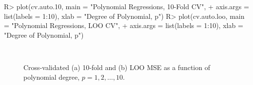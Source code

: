 \documentclass[
]{jss}
\begin{document}
\begin{CodeChunk}
\begin{CodeInput}
R> plot(cv.auto.10, main = "Polynomial Regressions, 10-Fold CV",
+      axis.args = list(labels = 1:10), xlab = "Degree of Polynomial, p")
R> plot(cv.auto.loo, main = "Polynomial Regressions, LOO CV",
+      axis.args = list(labels = 1:10), xlab = "Degree of Polynomial, p")
\end{CodeInput}
\begin{figure}

{\centering {}~~~

}

\caption[Cross-validated (a) 10-fold and (b) LOO MSE as a function of polynomial degree, $p = 1, 2, \ldots, 10$]{Cross-validated (a) 10-fold and (b) LOO MSE as a function of polynomial degree, $p = 1, 2, \ldots, 10$.}\label{fig:polynomial-regression-CV-graph-2}
\end{figure}
\end{CodeChunk}
\end{document}
